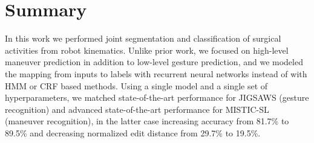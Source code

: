 \documentclass{llncs}
\begin{document}
\section{Summary}

In this work we performed joint segmentation and classification of surgical activities from robot kinematics. Unlike prior work, we focused on high-level maneuver prediction in addition to low-level gesture prediction, and we modeled the mapping from inputs to labels with recurrent neural networks instead of with HMM or CRF based methods. Using a single model and a single set of hyperparameters, we matched state-of-the-art performance for JIGSAWS (gesture recognition) and advanced state-of-the-art performance for MISTIC-SL (maneuver recognition), in the latter case increasing accuracy from 81.7\% to 89.5\% and decreasing normalized edit distance from 29.7\% to 19.5\%.



\end{document}
